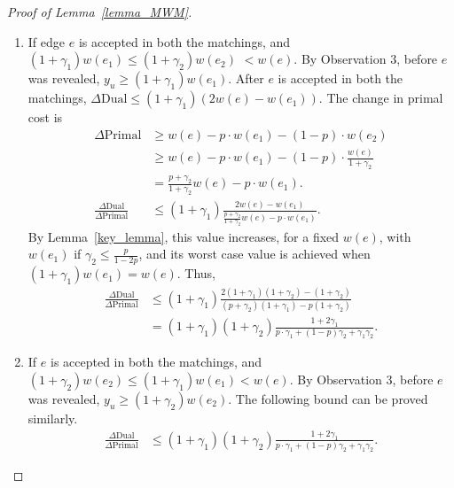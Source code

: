 \documentclass[11pt]{article}
\begin{document}
\begin{proof}[Proof of Lemma~\ref{lemma_MWM}]
\begin{enumerate}
 \item If edge $e$ is accepted in both the matchings, and $(1+\gamma_1)w(e_1) \leq (1+\gamma_2)w(e_2)$ $ < w(e)$. By Observation $3$, before $e$ was revealed, $y_u\geq(1+\gamma_1)w(e_1)$. After $e$ is accepted in both the matchings, $\Delta\text{Dual} \leq (1+\gamma_1)(2w(e)-w(e_1))$. The change in primal cost is
 \begin{align*}
 \Delta\text{Primal} &\geq w(e)-p\cdot w(e_1) - (1-p)\cdot w(e_2) \\
  &\geq w(e) - p\cdot w(e_1) - (1-p)\cdot \frac{w(e)}{1+\gamma_2}\\
  &=\frac{p+\gamma_2}{1+\gamma_2}w(e) -p\cdot w(e_1).\\
  \frac{\Delta\text{Dual}}{\Delta\text{Primal} }&\leq (1+\gamma_1)\frac{2w(e)-w(e_1)}{\frac{p+\gamma_2}{1+\gamma_2}w(e) -p\cdot w(e_1)}.  
 \end{align*}
By Lemma~\ref{key_lemma}, this value increases, for a fixed $w(e)$, with $w(e_1)$ if $\gamma_2\leq \frac{p}{1-2p}$, and its worst case value is achieved when $(1+\gamma_1)w(e_1)=w(e)$. Thus,
\begin{align*}
 \frac{\Delta\text{Dual}}{\Delta\text{Primal} }&\leq (1+\gamma_1)\frac{2(1+\gamma_1)(1+\gamma_2)-(1+\gamma_2)}{(p+\gamma_2)(1+\gamma_1) -p(1+\gamma_2)}\\
 &= (1+\gamma_1)(1+\gamma_2)\frac{1+2\gamma_1}{p\cdot \gamma_1 + (1-p)\gamma_2 + \gamma_1\gamma_2}.
\end{align*}

\item If $e$ is accepted in both the matchings, and $(1+\gamma_2)w(e_2) \leq (1+\gamma_1)w(e_1) < w(e)$. By Observation $3$, before $e$ was revealed, $y_u\geq(1+\gamma_2)w(e_2)$. The following bound can be proved similarly.
\begin{align*}
 \frac{\Delta\text{Dual}}{\Delta\text{Primal} } &\leq (1+\gamma_1)(1+\gamma_2)\frac{1+2\gamma_1}{p\cdot \gamma_1 + (1-p)\gamma_2 + \gamma_1\gamma_2}.
\end{align*}

\end{enumerate}
\end{proof}
\end{document}

